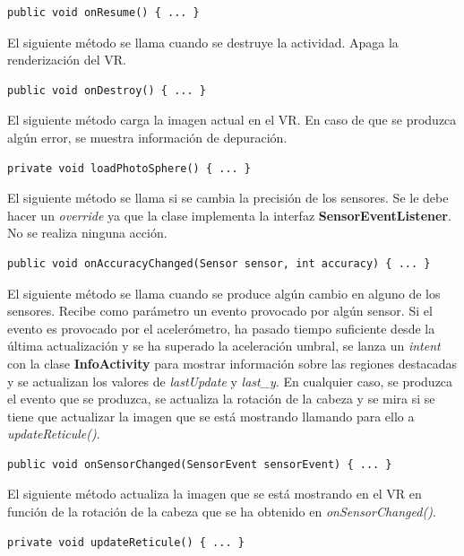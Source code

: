 \documentclass[11pt,a4paper]{article}
\begin{document}
\begin{lstlisting}
public void onResume() { ... }
\end{lstlisting}

El siguiente método se llama cuando se destruye la actividad. Apaga la renderización del VR.

\begin{lstlisting}
public void onDestroy() { ... }
\end{lstlisting}

El siguiente método carga la imagen actual en el VR. En caso de que se produzca algún error, se muestra información de depuración.

\begin{lstlisting}
private void loadPhotoSphere() { ... }
\end{lstlisting}

El siguiente método se llama si se cambia la precisión de los sensores. Se le debe hacer un \textit{override} ya que la clase
implementa la interfaz \textbf{SensorEventListener}. No se realiza ninguna acción.

\begin{lstlisting}
public void onAccuracyChanged(Sensor sensor, int accuracy) { ... }
\end{lstlisting}

El siguiente método se llama cuando se produce algún cambio en alguno de los sensores. Recibe como parámetro un evento provocado
por algún sensor. Si el evento es provocado por el acelerómetro, ha pasado tiempo suficiente desde la última actualización y se ha
superado la aceleración umbral, se lanza un \textit{intent} con la clase \textbf{InfoActivity} para mostrar información sobre las
regiones destacadas y se actualizan los valores de \textit{lastUpdate} y \textit{last\_y}. En cualquier caso, se produzca el evento
que se produzca, se actualiza la rotación de la cabeza y se mira si se tiene que actualizar la imagen que se está mostrando llamando
para ello a \textit{updateReticule()}.

\begin{lstlisting}
public void onSensorChanged(SensorEvent sensorEvent) { ... }
\end{lstlisting}

El siguiente método actualiza la imagen que se está mostrando en el VR en función de la rotación de la cabeza que se ha obtenido en
\textit{onSensorChanged()}.

\begin{lstlisting}
private void updateReticule() { ... }
\end{lstlisting}
\end{document}
